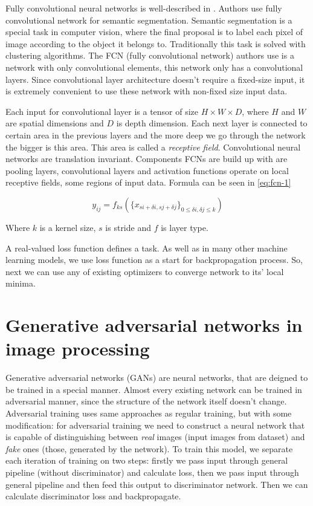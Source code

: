 Fully convolutional neural networks is well-described in \cite{fcn}. Authors use fully convolutional network for semantic segmentation. Semantic segmentation is a special task in computer vision, where the final proposal is to label each pixel of image according to the object it belongs to. Traditionally this task is solved with clustering algorithms. The FCN (fully convolutional network) authors use is a network with only convolutional elements, this network only has a convolutional layers. Since convolutional layer architecture doesn't require a fixed-size input, it is extremely convenient to use these network with non-fixed size input data.

Each input for convolutional layer is a tensor of size $H \times W \times D$, where $H$ and $W$ are spatial dimensions and $D$ is depth dimension. Each next layer is connected to certain area in the previous layers and the more deep we go through the network the bigger is this area. This area is called a \textit{receptive field}. Convolutional neural networks are translation invariant. Components FCNs are build up with are pooling layers, convolutional layers and activation functions operate on local receptive fields, some regions of input data. Formula can be seen in \ref{eq:fcn-1}

\begin{equation}
    \label{eq:fcn-1}
    y_{ij} = f_{ks}(\{ x_{si + \delta i, sj + \delta j} \}_{0 \le \delta i, \delta j \le k})
\end{equation}

Where $k$ is a kernel size, $s$ is stride and $f$ is layer type.

A real-valued loss function defines a task. As well as in many other machine learning models, we use loss function as a start for backpropagation process. So, next we can use any of existing optimizers to converge network to its' local minima.

\section{Generative adversarial networks in image processing}

Generative adversarial networks (GANs) are neural networks, that are deigned to be trained in a special manner. Almost every existing network can be trained in adversarial manner, since the structure of the network itself doesn't change. Adversarial training uses same approaches as regular training, but with some modification: for adversarial training we need to construct a neural network that is capable of distinguishing between \textit{real} images (input images from dataset) and \textit{fake} ones (those, generated by the network). To train this model, we separate each iteration of training on two steps: firstly we pass input through general pipeline (without discriminator) and calculate loss, then we pass input through general pipeline and then feed this output to discriminator network. Then we can calculate discriminator loss and backpropagate.

